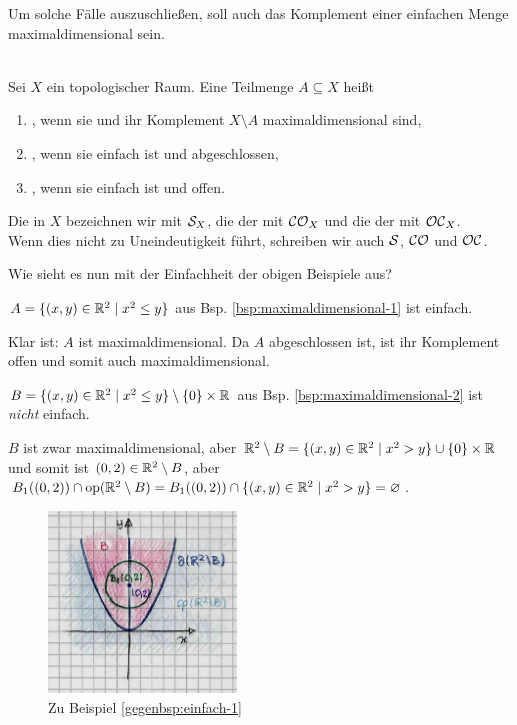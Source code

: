     Um
    solche Fälle auszuschließen, soll auch das Komplement einer einfachen Menge maximaldimensional sein.
%
    \begin{dfn}\label{def:einf}\ \\
        Sei $X$ ein topologischer Raum. Eine Teilmenge $A \subseteq X$ heißt 
        \begin{enumerate}
            \item {}, wenn sie und ihr Komplement $X \setminus A$ maximaldimensional sind,
            \item {}, wenn sie einfach ist und abgeschlossen,
            \item {}, wenn sie einfach ist und offen.
        \end{enumerate}
        Die  in $X$ bezeichnen wir mit $\mathcal{S}_X$, die der  mit $\mathcal{CO}_X$ und die der  mit $\mathcal{OC}_X$.\\
        Wenn dies nicht zu Uneindeutigkeit führt, schreiben wir auch $\mathcal{S}$, $\mathcal{CO}$ und $\mathcal{OC}$.
    \end{dfn}
%
%
    Wie sieht es nun mit der Einfachheit der obigen Beispiele aus?
%
    \begin{bsp}\label{bsp:einfach}
        $A = \{(x,y) \in \mathbb{R}^2 \mid x^2 \leq y\}$ aus Bsp. \ref{bsp:maximaldimensional-1} ist einfach.
    \end{bsp}
%
    \begin{bew}
        Klar ist: $A$ ist maximaldimensional. Da $A$ abgeschlossen ist, ist ihr Komplement offen und somit auch maximaldimensional.
    \end{bew}
%
%
    \begin{gegenbsp}\label{gegenbsp:einfach-1}
        $B = \{(x,y) \in \mathbb{R}^2 \mid x^2 \leq y\} \setminus \{0\} \times \mathbb{R}$ aus Bsp. \ref{bsp:maximaldimensional-2} ist \textit{nicht} einfach.
    \end{gegenbsp}
%
    \begin{bew}
        $B$ ist zwar maximaldimensional, aber $\mathbb{R}^2 \setminus B = \{(x,y) \in \mathbb{R}^2 \mid x^2 > y\} \cup \{0\} \times \mathbb{R}$ und somit ist $(0,2) \in \mathbb{R}^2 \setminus B$, aber $B_1((0,2)) \cap \text{op}(\mathbb{R}^2 \setminus B) = B_1((0,2)) \cap \{(x,y) \in \mathbb{R}^2 \mid x^2 > y\} = \varnothing$.
    \end{bew}
%
    \begin{figure}[ht]
        \centering
        \includegraphics[width=5cm]{abb/nicht-einfach.png}
        \caption{Zu Beispiel \ref{gegenbsp:einfach-1}}
        \label{fig:nicht-einfach}
    \end{figure}
